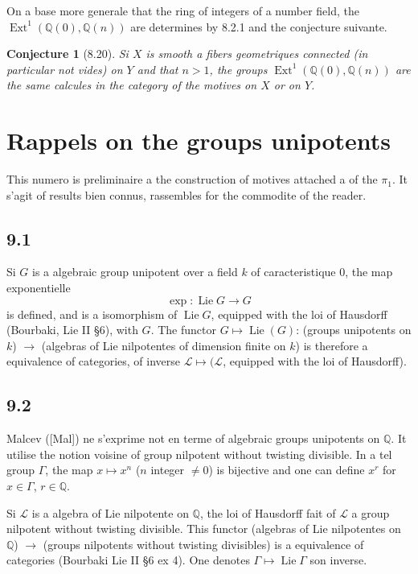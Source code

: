 \documentclass[12pt,a4paper]{article}
\theoremstyle{plain}
\newtheorem{conjecture}[theorem]{Conjecture}
\theoremstyle{definition}
\theoremstyle{remark}
\DeclareMathOperator{\Lie}{Lie}
\DeclareMathOperator{\Ext}{Ext}
\newcommand{\Q}{\mathbb{Q}}
\begin{document}
On a base more generale that the ring of integers of a number field, the $\Ext^1(\Q(0), \Q(n))$ are determines by 8.2.1 and the conjecture suivante.

\begin{conjecture}[8.20]
Si $X$ is smooth a fibers geometriques connected (in particular not vides) on $Y$ and that $n > 1$, the groups $\Ext^1(\Q(0), \Q(n))$ are the same calcules in the category of the motives on $X$ or on $Y$.
\end{conjecture}

\section{Rappels on the groups unipotents}

This numero is preliminaire a the construction of motives attached a of the $\pi_1$. It s'agit of results bien connus, rassembles for the commodite of the reader.

\subsection*{9.1}

Si $G$ is a algebraic group unipotent over a field $k$ of caracteristique 0, the map exponentielle
$$\exp : \Lie G \longrightarrow G$$
is defined, and is a isomorphism of $\Lie G$, equipped with the loi of Hausdorff (Bourbaki, Lie II \S 6), with $G$. The functor $G \mapsto \Lie(G)$: (groups unipotents on $k$) $\to$ (algebras of Lie nilpotentes of dimension finite on $k$) is therefore a equivalence of categories, of inverse $\mathcal{L} \mapsto (\mathcal{L}$, equipped with the loi of Hausdorff).

\subsection*{9.2}

Malcev ([Mal]) ne s'exprime not en terme of algebraic groups unipotents on $\Q$. It utilise the notion voisine of group nilpotent without twisting divisible. In a tel group $\Gamma$, the map $x \mapsto x^n$ ($n$ integer $\neq 0$) is bijective and one can define $x^r$ for $x \in \Gamma$, $r \in \Q$.

Si $\mathcal{L}$ is a algebra of Lie nilpotente on $\Q$, the loi of Hausdorff fait of $\mathcal{L}$ a group nilpotent without twisting divisible. This functor (algebras of Lie nilpotentes on $\Q$) $\to$ (groups nilpotents without twisting divisibles) is a equivalence of categories (Bourbaki Lie II \S 6 ex 4). One denotes $\Gamma \mapsto \Lie \Gamma$ son inverse.
\end{document}

